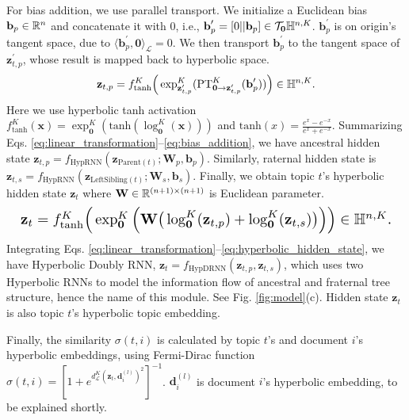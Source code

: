 For bias addition, we use parallel transport. We initialize a Euclidean bias $ \textbf{b}_p\in\Bbb R^n $ and concatenate it with 0, i.e., $ \textbf{b}_p^\prime=[0||\textbf{b}_p]\in\mathcal{T}_{\textbf{0}}\Bbb H^{n,K} $. $ \textbf{b}_p^\prime $ is on origin's tangent space, due to $ \langle\textbf{b}_p^\prime,\textbf{0}\rangle_{\mathcal{L}}=0 $. We then transport $ \textbf{b}_p^\prime $ to the tangent space of $ \textbf{z}_{t,p}^\prime $, whose result is mapped back to hyperbolic space.
\begin{equation}
\label{eq:bias_addition}
    \textbf{z}_{t,p}=f_{\text{tanh}}^K\Big(\exp_{\textbf{z}_{t,p}^\prime}^K(\text{PT}^K_{\textbf{0}\rightarrow\textbf{z}_{t,p}^\prime}(\textbf{b}_p^\prime))\Big)\in\Bbb H^{n,K}.
\end{equation}
Here we use hyperbolic tanh activation $ f_{\text{tanh}}^K(\textbf{x})=\exp_{\textbf{0}}^K(\text{tanh}(\log_{\textbf{0}}^K(\textbf{x}))) $ and $ \text{tanh}(x)=\frac{e^x-e^{-x}}{e^x+e^{-x}} $. Summarizing Eqs. \ref{eq:linear_transformation}--\ref{eq:bias_addition}, we have ancestral hidden state $ \textbf{z}_{t,p}=f_{\text{HypRNN}}(\textbf{z}_{\text{Parent}(t)};\textbf{W}_p,\textbf{b}_p) $. Similarly, raternal hidden state is $ \textbf{z}_{t,s}=f_{\text{HypRNN}}(\textbf{z}_{\text{LeftSibling}(t)};\textbf{W}_s,\textbf{b}_s) $. Finally, we obtain topic $ t $'s hyperbolic hidden state $ \textbf{z}_t $ where $ \textbf{W}\in\Bbb R^{(n+1)\times(n+1)} $ is Euclidean parameter.
\begin{equation}
\label{eq:hyperbolic_hidden_state}
\resizebox{1\columnwidth}{!}{
    $ \textbf{z}_t=f^K_{\text{tanh}}\Big(\exp_{\textbf{0}}^K\Big(\textbf{W}\big(\log_{\textbf{0}}^K(\textbf{z}_{t,p})+\log_{\textbf{0}}^K(\textbf{z}_{t,s})\big)\Big)\Big)\in\Bbb H^{n,K}. $
    }
\end{equation}
Integrating Eqs. \ref{eq:linear_transformation}--\ref{eq:hyperbolic_hidden_state}, we have Hyperbolic Doubly RNN, $ \textbf{z}_t=f_{\text{HypDRNN}}(\textbf{z}_{t,p},\textbf{z}_{t,s}) $, which uses two Hyperbolic RNNs to model the information flow of ancestral and fraternal tree structure, hence the name of this module. See Fig. \ref{fig:model}(c). Hidden state $ \textbf{z}_t $ is also topic $ t $'s hyperbolic topic embedding.

Finally, the similarity $ \sigma(t,i) $ is calculated by topic $ t $'s and document $ i $'s hyperbolic embeddings, using Fermi-Dirac function $ \sigma(t,i)=[1+e^{d_{\mathcal{L}}^K(\textbf{z}_t,\textbf{d}_i^{(l)})^2}]^{-1} $. %
$ \textbf{d}_i^{(l)} $ is document $ i $'s hyperbolic embedding, to be explained shortly.


